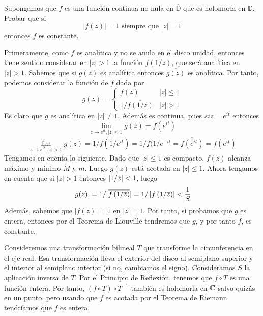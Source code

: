 \documentclass[twoside]{article}
\begin{document}
\begin{ejercicio}{9}
Supongamos que $f$ es una función continua no nula en $\overline{\mathbb{D}}$ que es holomorfa en $\mathbb{D}$. Probar que si 
$$
|f(z)|=1 \text{ siempre que } |z|=1
$$
entonces $f$ es constante.
\end{ejercicio}
\begin{solucion}
Primeramente, como $f$ es analítica y no se anula en el disco unidad, entonces tiene sentido considerar en $|z|>1$ la función $f(1/z)$, que será analítica en $|z|>1$. Sabemos que si $g(z)$ es analítica entonces $\overline{g(\overline{z})}$ es analítica.  Por tanto, podemos considerar la función de $f$ dada por 
$$
g(z)=
\begin{cases}
f(z) & |z|\leq 1\\
1/\overline{f\left({1}/{\overline{z}}\right)} & |z|>1
\end{cases}
$$
Es claro que $g$ es analítica en $|z|\neq 1$. Además es continua, pues $si z= e^{it}$ entonces
$$
\lim_{z\to e^{it},|z|\leq 1}g(z)=f(e^{it})
$$
$$
\lim_{z\to e^{it},|z|>1}g(z)=1/\overline{f(1/\overline{e^{it}})} = 1/\overline{f(1/e^{-it}}=\overline{f(e^{it})} = f(e^{it})
$$ Tengamos en cuenta lo siguiente. Dado que $|z|\leq 1$ es compacto, $f(z)$ alcanza máximo y mínimo $M$ y $m$. Luego $g(z)$ está acotada en $|z|\leq 1$. Ahora tengamos en cuenta que si $|z|>1$ entonces $\left\lvert1/\overline{z}\right\rvert<1$, luego 
$$|g(z)| = 1/|\overline{f\left({1}/{\overline{z}}\right)}| = 1/\left\lvert f\left({1}/{\overline{z}}\right)\right\rvert<\frac{1}{S}
$$
Además, sabemos que $|f(z)|=1$ en $|z|=1$. Por tanto, si probamos que $g$ es entera, entonces por el Teorema de Liouville tendremos que $g$, y por tanto $f$, es constante.

Consideremos una transformación bilineal $T$ que transforme la circunferencia en el eje real. Esa transformación lleva el exterior del disco al semiplano superior y el interior al semiplano interior (si no, cambiamos el signo). Consideramos $S$ la aplicación inversa de $T$. Por el Principio de Reflexión, tenemos que $f \circ T$ es una función entera. Por tanto, $(f\circ T)\circ T^{-1}$ también es holomorfa en $\mathbb{C}$ salvo quizás en un punto, pero usando que $f$ es acotada por el Teorema de Riemann tendríamos que $f$ es entera.

\end{solucion}
\newpage
\end{document}
